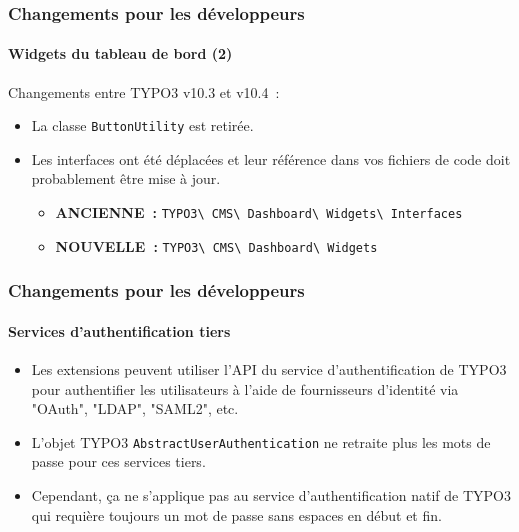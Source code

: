 \begin{frame}[fragile]
	\frametitle{Changements pour les développeurs}
	\framesubtitle{Widgets du tableau de bord (2)}

	Changements entre TYPO3 v10.3 et v10.4~:

	\begin{itemize}
		\item La classe \texttt{ButtonUtility} est retirée.
		\item Les interfaces ont été déplacées et leur référence dans vos fichiers
			de code doit probablement être mise à jour.
			\begin{itemize}\smaller
				\item \textbf{ANCIENNE~:}
					\texttt{TYPO3\textbackslash
						CMS\textbackslash
						Dashboard\textbackslash
						Widgets\textbackslash
						Interfaces}
				\item \textbf{NOUVELLE~:}
					\texttt{TYPO3\textbackslash
						CMS\textbackslash
						Dashboard\textbackslash
						Widgets}
			\end{itemize}\normalsize
	\end{itemize}

\end{frame}


\begin{frame}[fragile]
	\frametitle{Changements pour les développeurs}
	\framesubtitle{Services d'authentification tiers}

	\begin{itemize}

		\item Les extensions peuvent utiliser l'API du service d'authentification de TYPO3 pour
			authentifier les utilisateurs à l'aide de fournisseurs d'identité via "OAuth", "LDAP", "SAML2", etc.
		\item L'objet TYPO3 \texttt{AbstractUserAuthentication} ne retraite plus les mots de passe
			pour ces services tiers.
		\item Cependant, ça ne s'applique pas au service d'authentification natif de TYPO3
			qui requière toujours un mot de passe sans espaces en début et fin.

	\end{itemize}

\end{frame}

